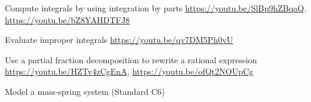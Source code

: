 \begin{readinessAssuranceResources}
\item Compute integrals by using integration by parts \url{https://youtu.be/SlBp9hZBqaQ}, \url{https://youtu.be/bZ8YAHDTFJ8}
\item Evaluate improper integrals \url{https://youtu.be/qv7DM5Ph0vU}
\item Use a partial fraction decomposition to rewrite a rational expression \url{https://youtu.be/HZTv4zCgEnA}, \url{https://youtu.be/ofQt2NOUpCg}
\item Model a mass-spring system (Standard C6)
\end{readinessAssuranceResources}
